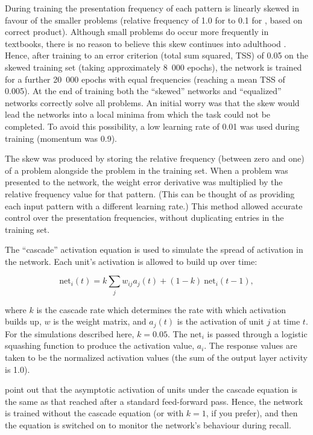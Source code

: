 During training the presentation frequency of each pattern is linearly
skewed in favour of the smaller problems (relative frequency of 1.0 for
 to 0.1 for , based on correct product). Although small problems do
occur more frequently in textbooks, there is no reason to believe this skew
continues into adulthood \cite[p. 328]{mcclmode}.  Hence, after training to
an error criterion (total sum squared, TSS) of 0.05 on the skewed training
set (taking approximately 8~000 epochs), the network is trained for a
further 20~000 epochs with equal frequencies (reaching a mean TSS of
0.005).  At the end of training both the ``skewed'' networks and
``equalized'' networks correctly solve all problems. An initial worry was
that the skew would lead the networks into a local
minima from which the task could not be completed. To avoid this
possibility, a low learning rate of 0.01 was used during training (momentum
was 0.9).

The skew was produced by storing the relative frequency (between zero and
one) of a problem alongside the problem in the training set.  When a
problem was presented to the network, the weight error derivative was
multiplied by the relative frequency value for that pattern. (This can be
thought of as providing each input pattern with a different
learning rate.) This method allowed accurate control over the presentation
frequencies, without duplicating entries in the training set.


The ``cascade'' activation equation
\cite[p.~153]{pdp3} is used to simulate the
spread of activation in the network. Each unit's activation is allowed
to build up over time:

\def\net{\mbox{net}}
$$ \net_i(t) = k \sum\limits_j w_{ij} a_j(t) + (1-k)\ \net_i(t-1), $$


\noindent where
$k$ is the cascade rate which determines the rate with which activation
builds up, $w$ is the weight matrix, and $a_j(t)$ is the activation of unit
$j$ at time $t$. For the simulations described here, $k=0.05$. The $\net_i$
is passed through a logistic squashing function to produce the activation
value, $a_i$.  The response values are taken to be the normalized
activation values (the sum of the output layer activity is 1.0).

 point out that the asymptotic activation of units under the
cascade equation is the same as that reached after a standard feed-forward
pass.
Hence, the network is trained without the cascade equation (or with
$k=1$, if you prefer), and then the equation is switched on to monitor
the network's behaviour during recall.


